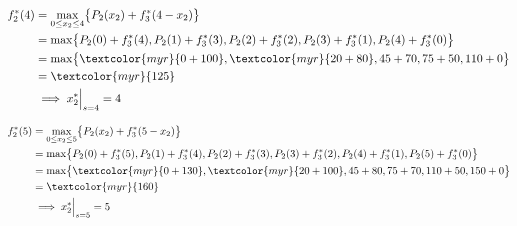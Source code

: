 \documentclass{report}
\begin{document}
\begin{align*}
    f_2^{*}(4) &= \max_{0 \leq x_2 \leq 4} \bigl\{ P_2(x_2) + f_3^{*}(4 - x_2) \bigr\} \\
               &= \max \bigl\{ P_2(0) + f_3^{*}(4), P_2(1) + f_3^{*}(3), P_2(2) + f_3^{*}(2), P_2(3) + f_3^{*}(1), P_2(4) + f_3^{*}(0) \bigr\} \\
               &= \max \bigl\{ \textcolor{myr}{0 + 100}, \textcolor{myr}{20 + 80}, 45 + 70, 75 + 50, 110 + 0 \bigr\} \\
               &= \textcolor{myr}{125} \\
               &\implies x_2^{*}\Big|_{s = 4} = 4
\end{align*}

\begin{align*}
    f_2^{*}(5) &= \max_{0 \leq x_2 \leq 5} \bigl\{ P_2(x_2) + f_3^{*}(5 - x_2) \bigr\} \\
               &= \max \bigl\{ P_2(0) + f_3^{*}(5), P_2(1) + f_3^{*}(4), P_2(2) + f_3^{*}(3), P_2(3) + f_3^{*}(2), P_2(4) + f_3^{*}(1), P_2(5) + f_3^{*}(0) \bigr\} \\
               &= \max \bigl\{ \textcolor{myr}{0 + 130}, \textcolor{myr}{20 + 100}, 45 + 80, 75 + 70, 110 + 50, 150 + 0 \bigr\} \\
               &= \textcolor{myr}{160} \\
               &\implies x_2^{*}\Big|_{s = 5} = 5
\end{align*}
\end{document}
